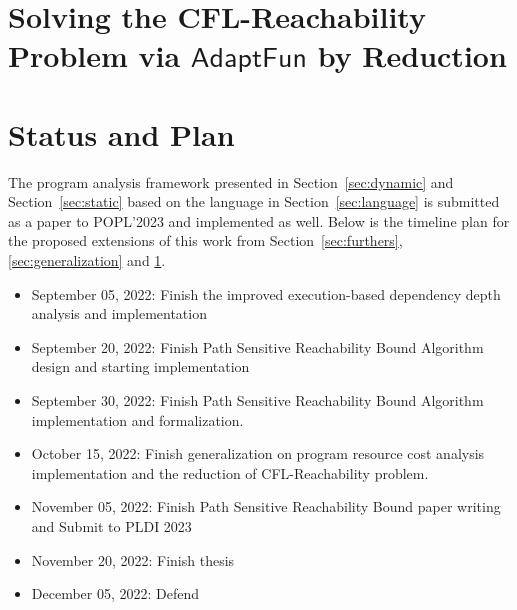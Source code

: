 \documentclass[a4paper,11pt]{article}
\newcommand{\THESYSTEM}{\textsf{AdaptFun}}
\begin{document}
\section{Solving the CFL-Reachability Problem via $\THESYSTEM$ by Reduction}
\label{sec:cfl_reduction}


\section{Status and Plan}
The program analysis framework presented in Section~\ref{sec:dynamic} and Section~\ref{sec:static} 
based on the language in Section~\ref{sec:language}
 is submitted as a paper to POPL'2023 and implemented as well. 
 Below is the timeline plan for the proposed extensions of this work
 from Section~\ref{sec:furthers}, \ref{sec:generalization} and \ref{sec:cfl_reduction}.
\begin{itemize}
\item September 05, 2022: Finish the improved execution-based dependency depth analysis and implementation
\item September 20, 2022: Finish Path Sensitive Reachability Bound Algorithm design and starting implementation
\item September 30, 2022: Finish Path Sensitive Reachability Bound Algorithm implementation and formalization.
\item October 15, 2022:  Finish generalization on program resource cost analysis implementation 
and the reduction of CFL-Reachability problem.
\item November 05, 2022: Finish Path Sensitive Reachability Bound paper writing and Submit to PLDI 2023
\item November 20, 2022: Finish thesis
\item December 05, 2022: Defend
\end{itemize}




\end{document}
